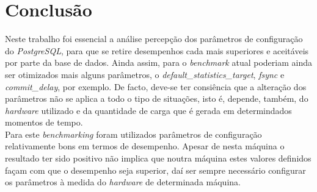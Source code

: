 \section{Conclusão}

Neste trabalho foi essencial a análise percepção dos parâmetros de configuração do \textit{PostgreSQL}, para que se retire desempenhos cada mais superiores e aceitáveis por parte da base de dados. Ainda assim, para o \textit{benchmark} atual poderiam ainda ser otimizados mais alguns parâmetros, o \textit{default\_statistics\_target}, \textit{fsync} e \textit{commit\_delay}, por exemplo. De facto, deve-se ter consiência que a alteração dos parâmetros não se aplica a todo o tipo de situações, isto é, depende, também, do \textit{hardware} utilizado e da quantidade de carga que é gerada em determindados momentos de tempo.\\

Para este \textit{benchmarking} foram utilizados parâmetros de configuração relativamente bons em termos de desempenho. Apesar de nesta máquina o resultado ter sido positivo não implica que noutra máquina estes valores definidos façam com que o desempenho seja superior, daí ser sempre necessário configurar os parâmetros à medida do \textit{hardware} de determinada máquina.
